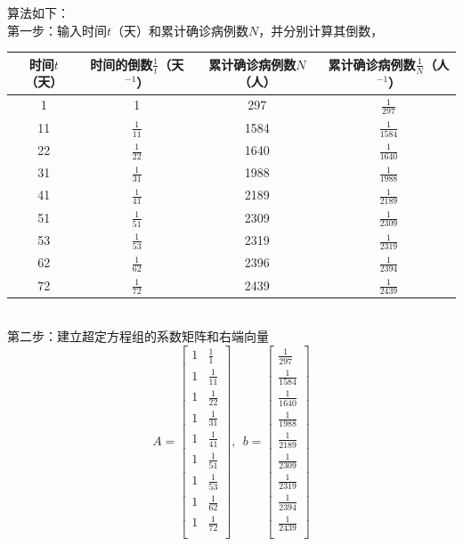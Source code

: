 \documentclass[10pt,a4paper]{article}
\begin{document}
算法如下：\\
第一步：输入时间$t$（天）和累计确诊病例数$N$，并分别计算其倒数，
\begin{table}[h]
\scriptsize
\begin{tabular}{|c|c|c|c|}
\hline
时间$t$（天） & 时间的倒数$\frac{1}{t}$（天$^{-1}$） & 累计确诊病例数$N$（人） & 累计确诊病例数$\frac{1}{N}$（人$^{-1}$） \\ \hline
1        & 1                            & 297           & $\frac{1}{297}$                \\ \hline
11       & $\frac{1}{11}$               & 1584          & $\frac{1}{1584}$               \\ \hline
22       & $\frac{1}{22}$               & 1640          & $\frac{1}{1640}$               \\ \hline
31       & $\frac{1}{31}$               & 1988          & $\frac{1}{1988}$               \\ \hline
41       & $\frac{1}{41}$               & 2189          & $\frac{1}{2189}$               \\ \hline
51       & $\frac{1}{51}$               & 2309          & $\frac{1}{2309}$               \\ \hline
53       & $\frac{1}{53}$               & 2319          & $\frac{1}{2319}$               \\ \hline
62       & $\frac{1}{62}$               & 2396          & $\frac{1}{2394}$               \\ \hline
72       & $\frac{1}{72}$               & 2439          & $\frac{1}{2439}$               \\ \hline
\end{tabular}
\end{table}
\\第二步：建立超定方程组的系数矩阵和右端向量
\[
A=\left[\begin{array}{cc}
1 & \frac{1}{1} \\
1 & \frac{1}{11} \\
1 & \frac{1}{22} \\
1 & \frac{1}{31} \\
1 & \frac{1}{41} \\
1 & \frac{1}{51} \\
1 & \frac{1}{53} \\
1 & \frac{1}{62} \\
1 & \frac{1}{72} \\
\end{array}\right],~~b=\left[\begin{array}{c}
\frac{1}{297} \\
\frac{1}{1584} \\
\frac{1}{1640} \\
\frac{1}{1988} \\
\frac{1}{2189} \\
\frac{1}{2309} \\
\frac{1}{2319} \\
\frac{1}{2394} \\
\frac{1}{2439} \\
\end{array}\right]
\]
\end{document}
